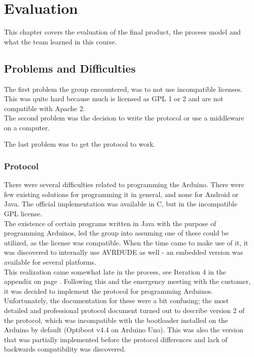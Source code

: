\chapter{Evaluation}

This chapter covers the evaluation of the final product, the process model and what the team learned in this course.

\section{Problems and Difficulties}
	The first problem the group encountered, was to not use incompatible licenses. This was quite hard because much is licensed as GPL 1 or 2 and are not compatible with Apache 2. \\

	The second problem was the decision to write the protocol or use a middleware on a computer.

	The last problem was to get the protocol to work.

\subsection{Protocol}
There were several difficulties related to programming the Arduino. There were few existing solutions for programming it in general, and none for Android or Java. The official implementation was available in C, but in the incompatible GPL license.\\

The existence of certain programs written in Java with the purpose of programming Arduinos,
led the group into assuming one of these could be utilized, as the license was compatible. When the time came to make use of it, it was discovered to internally use AVRDUDE as well - an embedded version was available for several platforms.\\

This realization came somewhat late in the process, see Iteration 4 in the appendix on page \pageref{Iteration4}. Following this and the emergency meeting with the customer, it was decided to implement the protocol for programming Arduinos. Unfortunately, the documentation for these were a bit confusing; the most detailed and professional protocol document turned out to describe version 2 of the protocol\cite{AVR068}, which was incompatible with the bootloader installed on the Arduino by default (Optiboot v4.4 on Arduino Uno). This was also the version that was partially implemented before the protocol differences and lack of backwards compatibility was discovered.\\


